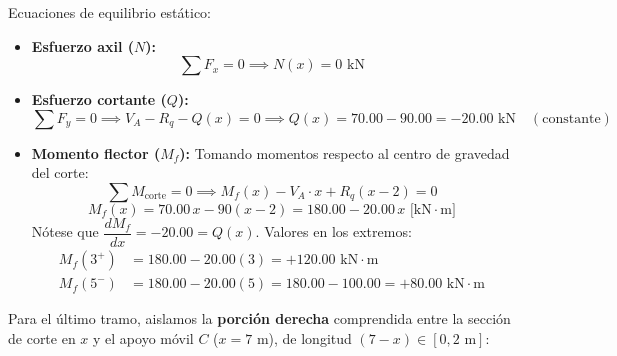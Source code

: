 Ecuaciones de equilibrio estático:
\begin{itemize}
    \item \textbf{Esfuerzo axil ($N$):}
          \begin{equation}
              \sum F_x = 0 \implies \boxed{N(x) = 0\text{ kN}}
          \end{equation}

    \item \textbf{Esfuerzo cortante ($Q$):}
          \begin{equation}
              \sum F_y = 0 \implies V_A - R_q - Q(x) = 0 \implies \boxed{Q(x) = 70.00 - 90.00 = -20.00\text{ kN}} \quad (\text{constante})
          \end{equation}

    \item \textbf{Momento flector ($M_f$):}
          Tomando momentos respecto al centro de gravedad del corte:
          \begin{equation}
              \sum M_{\text{corte}} = 0 \implies M_f(x) - V_A \cdot x + R_q(x - 2) = 0
          \end{equation}
          \begin{equation}
              \boxed{M_f(x) = 70.00\,x - 90(x - 2) = 180.00 - 20.00\,x\text{ [kN}\cdot\text{m]}}
          \end{equation}
          Nótese que $\dfrac{dM_f}{dx} = -20.00 = Q(x)$.
          Valores en los extremos:
          \begin{align*}
              M_f(3^+) & = 180.00 - 20.00(3) = \boxed{+120.00\text{ kN}\cdot\text{m}}                  \\
              M_f(5^-) & = 180.00 - 20.00(5) = 180.00 - 100.00 = \boxed{+80.00\text{ kN}\cdot\text{m}}
          \end{align*}
\end{itemize}


Para el último tramo, aislamos la \textbf{porción derecha} comprendida entre la sección de corte en $x$ y el apoyo móvil $C$ ($x = 7\text{ m}$), de longitud $(7 - x) \in [0, 2\text{ m}]$:

